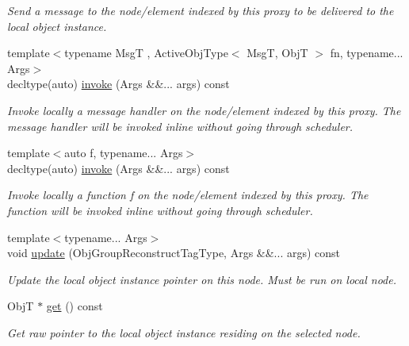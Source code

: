 \begin{DoxyCompactItemize}
\begin{DoxyCompactList}\small\item\em Send a message to the node/element indexed by this proxy to be delivered to the local object instance. \end{DoxyCompactList}\item 
{\footnotesize template$<$typename MsgT , Active\+Obj\+Type$<$ Msg\+T, Obj\+T $>$ fn, typename... Args$>$ }\\decltype(auto) \hyperlink{structvt_1_1objgroup_1_1proxy_1_1_proxy_elm_a6dcda2aa12a605aceac3a1bba468e16f}{invoke} (Args \&\&... args) const
\begin{DoxyCompactList}\small\item\em Invoke locally a message handler on the node/element indexed by this proxy. The message handler will be invoked inline without going through scheduler. \end{DoxyCompactList}\item 
{\footnotesize template$<$auto f, typename... Args$>$ }\\decltype(auto) \hyperlink{structvt_1_1objgroup_1_1proxy_1_1_proxy_elm_aa321d09d21afe3491f03a956f83525dd}{invoke} (Args \&\&... args) const
\begin{DoxyCompactList}\small\item\em Invoke locally a function \textquotesingle{}f\textquotesingle{} on the node/element indexed by this proxy. The function will be invoked inline without going through scheduler. \end{DoxyCompactList}\item 
{\footnotesize template$<$typename... Args$>$ }\\void \hyperlink{structvt_1_1objgroup_1_1proxy_1_1_proxy_elm_ac86c33cf46c63e61413b07509d3b9005}{update} (Obj\+Group\+Reconstruct\+Tag\+Type, Args \&\&... args) const
\begin{DoxyCompactList}\small\item\em Update the local object instance pointer on this node. Must be run on local node. \end{DoxyCompactList}\item 
ObjT $\ast$ \hyperlink{structvt_1_1objgroup_1_1proxy_1_1_proxy_elm_a4acec5b08c91f8d23a19cc6a61b19c48}{get} () const
\begin{DoxyCompactList}\small\item\em Get raw pointer to the local object instance residing on the selected node. \end{DoxyCompactList}\item 

\end{DoxyCompactItemize}
